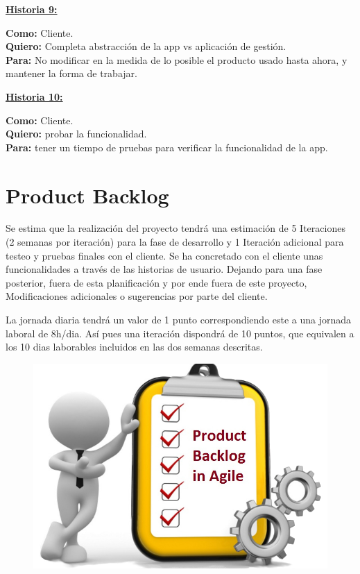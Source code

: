  \clearpage
 
\begin{shaded}
	\underline{\textbf{Historia 9:}}
	\begin{flushleft}	
		\textbf{Como:} Cliente.\\
		\textbf{Quiero:} Completa abstracción de la app vs aplicación de gestión.\\
		\textbf{Para:} No modificar en la medida de lo posible el producto usado hasta ahora, y mantener la forma de trabajar.\\ 
	\end{flushleft}			
\end{shaded} 


\begin{shaded}
	\underline{\textbf{Historia 10:}}
	\begin{flushleft}	
		\textbf{Como:} Cliente.\\
		\textbf{Quiero:} probar la funcionalidad.\\
		\textbf{Para:} tener un tiempo de pruebas para verificar la funcionalidad de la app.\\ 
	\end{flushleft}			
\end{shaded} 

\section{Product Backlog}

Se estima que la realización del proyecto tendrá una estimación de 5 Iteraciones (2 semanas por iteración) para la fase de desarrollo y 1 Iteración adicional para testeo y pruebas finales con el cliente. Se ha concretado con el cliente unas funcionalidades a través de las historias de usuario. Dejando para una fase posterior, fuera de esta planificación y por ende fuera de este proyecto, Modificaciones adicionales o sugerencias por parte del cliente. 

La jornada diaria tendrá un valor de 1 punto correspondiendo este a una jornada laboral de 8h/dia. Así pues una iteración dispondrá de 10 puntos, que equivalen a los 10 dias laborables incluidos en las dos semanas descritas.

\begin{figure}[H]
	\centering
	\includegraphics[width=0.55\linewidth]{figuras/spring}
	\label{fig:spring}
\end{figure}

